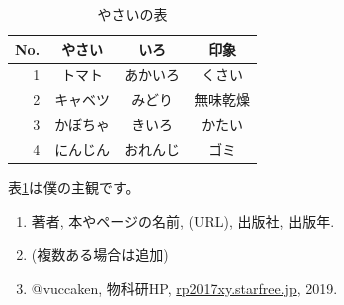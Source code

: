 \documentclass[10pt,b5paper,papersize,dvipdfmx]{jsbook}
\begin{document}
\begin{table}[htbp]
  \centering
  \caption{やさいの表}
  \label{tbl:vegetable}
  \begin{tabular}{r|ccc} \hline
      No. & やさい & いろ & 印象 \\ \hline
      1 & トマト & あかいろ & くさい \\
      2 & キャベツ & みどり & 無味乾燥 \\
      3 & かぼちゃ & きいろ & かたい \\
      4 & にんじん & おれんじ & ゴミ \\ \hline
  \end{tabular}
\end{table}

表\ref{tbl:vegetable}は僕の主観です。


\begin{sanko}
  \begin{enumerate}
    \item 著者, 本やページの名前, (URL), 出版社, 出版年.
    \item (複数ある場合は追加)
    \item @vuccaken, 物科研HP, \url{rp2017xy.starfree.jp}, 2019.
  \end{enumerate}
\end{sanko}
\end{document}
